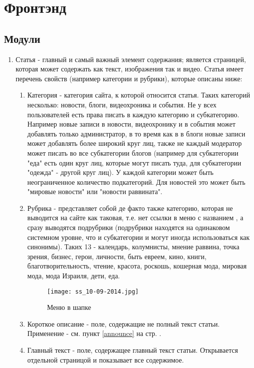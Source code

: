 \documentclass[DIV=calc, paper=a4, fontsize=11pt]{scrartcl} %
\begin{document}
\section{Фронтэнд}
\subsection{Модули}


\begin{enumerate}
\item Статья - главный и самый важный элемент содержания; является страницей, которая может содержать как текст, изображения так и видео. Статья имеет перечень свойств (например категории и рубрики), которые описаны ниже:
    \begin{enumerate}
    \item{Категория} - категория сайта, к которой относится статья. Таких категорий несколько: новости, блоги, видеохроника и события. Не у всех пользователей есть права писать в каждую категорию и субкатегорию. Например новые записи в новости, видеохронику и в события может добавлять только администратор, в то время как в в блоги новые записи может добавлять более широкий круг лиц, также не каждый модератор может писать во все субкатегории блогов (например для субкатегории "еда" есть один круг лиц, которые могут писать туда, для субкатегории "одежда" - другой круг лиц). У каждой категории может быть неограниченное количество \label{subcategory} подкатегорий. Для новостей это может быть "мировые новости" или "новости раввината".
    \item{Рубрика} - представляет собой де факто также категорию, которая не выводится на сайте как таковая, т.е. нет ссылки в меню с названием , а сразу выводятся подрубрики (подрубрики находятся на одинаковом системном уровне, что и субкатегории и могут иногда использоваться как синонимы). Таких 13 - календарь, колумнисты, мнение раввина, точка зрения, бизнес, герои, личности, быть евреем, кино, книги, благотворительность, чтение, красота, роскошь, кошерная мода, мировая мода, мода Израиля, дети, еда.
        \begin{figure}[ht!]
        \centering
        \texttt{[image: ss\_10-09-2014.jpg]}
        \caption{Меню в шапке \label{overflow}}
        \end{figure}
    \item{Короткое описание} - поле, содержащие не полный текст статьи. Применение - см. пункт \ref{announce} на стр. \pageref{announce}.
    \item{Главный текст} - поле, содержащее главный текст статьи. Открывается отдельной страницой и показывает все содержимое.

\end{enumerate}
\end{enumerate}
\end{document}
